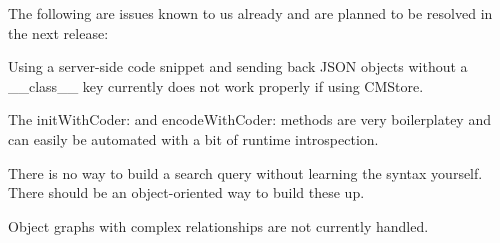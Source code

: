 The following are issues known to us already and are planned to be resolved in the next release\-:


\begin{DoxyItemize}
\item Using a server-\/side code snippet and sending back J\-S\-O\-N objects without a {\ttfamily \-\_\-\-\_\-class\-\_\-\-\_\-} key currently does not work properly if using {\ttfamily C\-M\-Store}.
\item The {\ttfamily init\-With\-Coder\-:} and {\ttfamily encode\-With\-Coder\-:} methods are very boilerplatey and can easily be automated with a bit of runtime introspection.
\item There is no way to build a search query without learning the syntax yourself. There should be an object-\/oriented way to build these up.
\item Object graphs with complex relationships are not currently handled. 
\end{DoxyItemize}